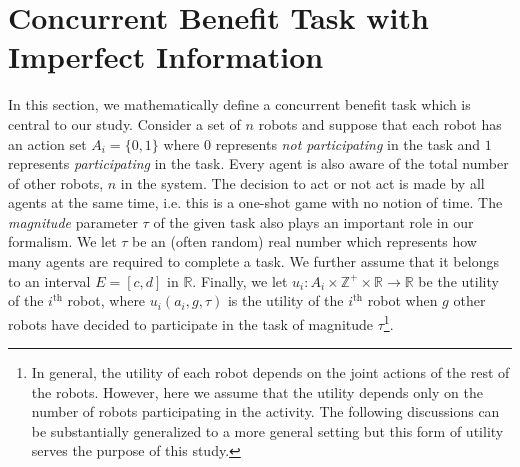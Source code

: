 \documentclass[conference]{ieeeconf}
\def\Z{\mathbb{Z}}
\def\R{\mathbb{R}}
\begin{document}
\section{Concurrent Benefit Task with Imperfect Information}\label{sec:conbenefit}
In this section, we mathematically define a concurrent benefit task which is central to our study. Consider a set of $n$ robots and suppose that each robot has an action set $A_i=\{0,1\}$ where $0$ represents \emph{not participating} in the task and $1$ represents \emph{participating} in the task. Every agent is also aware of the total number of other robots, $n$ in the system. The decision to act or not act is made by all agents at the same time, i.e. this is a one-shot game with no notion of time. The \emph{magnitude} parameter $\tau$ of the given task also plays an important role in our formalism. We let $\tau$ be an (often random) real number which represents how many agents are required to complete a task. We further assume that it belongs to an interval $E=[c,d]$ in $\R$.  Finally, we let $u_i:A_i\times\Z^+\times \R\to \R$ be the utility of the $i^{\text{th}}$ robot, where $u_i(a_i,g,\tau)$ is the utility of the $i^{\text{th}}$ robot when $g$ other robots have decided to participate in the task of magnitude $\tau$\footnote{In general, the utility of each robot depends on the joint actions of the rest of the robots. However, here we assume that the utility depends only on the number of robots participating in the activity. The following discussions can be substantially generalized to a more general setting but this form of utility serves the purpose of this study.}. 

\end{document}
